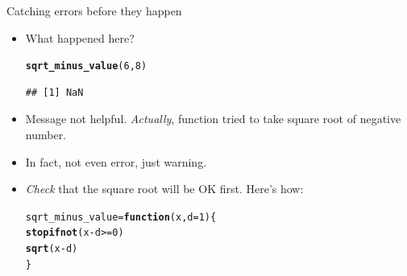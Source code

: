 \documentclass[unknownkeysallowed]{beamer}\usepackage[]{graphicx}\usepackage[]{color}
\makeatletter
\newcommand{\hlnum}[1]{\textcolor[rgb]{0.686,0.059,0.569}{#1}}%
\newcommand{\hlopt}[1]{\textcolor[rgb]{0,0,0}{#1}}%
\newcommand{\hlstd}[1]{\textcolor[rgb]{0.345,0.345,0.345}{#1}}%
\newcommand{\hlkwa}[1]{\textcolor[rgb]{0.161,0.373,0.58}{\textbf{#1}}}%
\newcommand{\hlkwb}[1]{\textcolor[rgb]{0.69,0.353,0.396}{#1}}%
\newcommand{\hlkwc}[1]{\textcolor[rgb]{0.333,0.667,0.333}{#1}}%
\newcommand{\hlkwd}[1]{\textcolor[rgb]{0.737,0.353,0.396}{\textbf{#1}}}%
\newenvironment{kframe}{%
 \def\at@end@of@kframe{}%
 \ifinner\ifhmode%
  \def\at@end@of@kframe{\end{minipage}}%
  \begin{minipage}{\columnwidth}%
 \fi\fi%
 \def\FrameCommand##1{\hskip\@totalleftmargin \hskip-\fboxsep
 \colorbox{shadecolor}{##1}\hskip-\fboxsep
     \hskip-\linewidth \hskip-\@totalleftmargin \hskip\columnwidth}%
 \MakeFramed {\advance\hsize-\width
   \@totalleftmargin\z@ \linewidth\hsize
   \@setminipage}}%
 {\par\unskip\endMakeFramed%
 \at@end@of@kframe}
\newenvironment{knitrout}{}{} %
\makeatother
\begin{document}
\begin{frame}[fragile]{Catching errors before they happen}
  
  \begin{itemize}
  \item What happened here?
    
\begin{knitrout}
\color{fgcolor}\begin{kframe}
\begin{alltt}
\hlkwd{sqrt_minus_value}\hlstd{(}\hlnum{6}\hlstd{,}\hlnum{8}\hlstd{)}
\end{alltt}


{\ttfamily\noindent\color{warningcolor}{\#\# Warning in sqrt(x - d): NaNs produced}}\begin{verbatim}
## [1] NaN
\end{verbatim}
\end{kframe}
\end{knitrout}
\item Message not helpful. \emph{Actually}, function tried to take
  square root of negative number.
\item In fact, not even error, just warning.
\item \emph{Check} that the square root will be OK
  first. Here's how:
  
\begin{knitrout}
\color{fgcolor}\begin{kframe}
\begin{alltt}
\hlstd{sqrt_minus_value}\hlkwb{=}\hlkwa{function}\hlstd{(}\hlkwc{x}\hlstd{,}\hlkwc{d}\hlstd{=}\hlnum{1}\hlstd{) \{}
  \hlkwd{stopifnot}\hlstd{(x}\hlopt{-}\hlstd{d}\hlopt{>=}\hlnum{0}\hlstd{)}
  \hlkwd{sqrt}\hlstd{(x}\hlopt{-}\hlstd{d)}
\hlstd{\}}
\end{alltt}
\end{kframe}
\end{knitrout}
  
  \end{itemize}
  
\end{frame}
\end{document}
